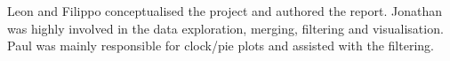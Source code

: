 \documentclass{article}
\theoremstyle{plain}
\theoremstyle{definition}
\theoremstyle{remark}
\begin{document}
Leon and Filippo conceptualised the project and authored the report. Jonathan was highly involved in the data exploration, merging, filtering and visualisation. Paul was mainly responsible for clock/pie plots and assisted with the filtering.
\\






\end{document}
